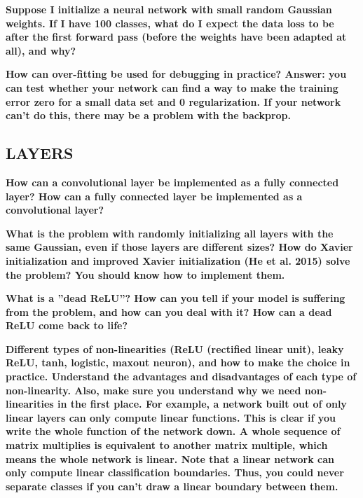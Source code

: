 \documentclass[10pt,letterpaper]{article}
\begin{document}
\subitem \textbf{ Suppose I initialize a neural network with small random Gaussian weights. If I have 100 classes, what do I expect the data loss to be after the first forward pass (before the weights have been adapted at all), and why?}
\begin{solution}
\end{solution}


\subitem \textbf{ How can over-fitting be used for debugging in practice? Answer: you can test whether your network can find a way to make the training error zero for a small data set and 0 regularization. If your network can’t do this, there may be a problem with the backprop. }
\begin{solution}
\end{solution}

\subsection{LAYERS}


\subitem \textbf{ How can a convolutional layer be implemented as a fully connected layer? How can a fully connected layer be implemented as a convolutional layer?}
\begin{solution}
\end{solution}

\subitem \textbf{ What is the problem with randomly initializing all layers with the same Gaussian, even if those layers are different sizes? How do Xavier initialization and improved Xavier initialization (He et al. 2015) solve the problem? You should know how to implement them.}
\begin{solution}
\end{solution}

\subitem \textbf{ What is a ”dead ReLU”? How can you tell if your model is suffering from the problem, and how can you deal with it? How can a dead ReLU come back to life?}
\begin{solution}
\end{solution}

\subitem \textbf{ Different types of non-linearities (ReLU (rectified linear unit), leaky ReLU, tanh, logistic, maxout neuron), and how to make the choice in practice. Understand the advantages and disadvantages of each type of non-linearity. Also, make sure you understand why we need non-linearities in the first place. For example, a network built out of only linear layers can only compute linear functions. This is clear if you write the whole function of the network down. A whole sequence of matrix multiplies is equivalent to another matrix multiple, which means the whole network is linear. Note that a linear network can only compute linear classification boundaries. Thus, you could never separate classes if you can’t draw a linear boundary between them.}
\begin{solution}
\end{solution}
\end{document}
